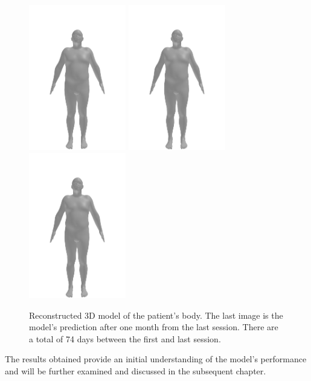 \begin{figure}[h]
    \includegraphics[width=120pt]{files/patients/2_10}
    \includegraphics[width=120pt]{files/patients/2_11}
    \linebreak
    \includegraphics[width=120pt]{files/patients/2_predicted}
    \caption[Reconstructed 3D model of the patient's body]{Reconstructed 3D model of the patient's body. The last image is the model's prediction after one month from the last session. There are a total of 74 days between the first and last session.}
    \label{fig:patient-body-model}
\end{figure}

The results obtained provide an initial understanding of the model's
performance and will be further examined and discussed in the subsequent
chapter.